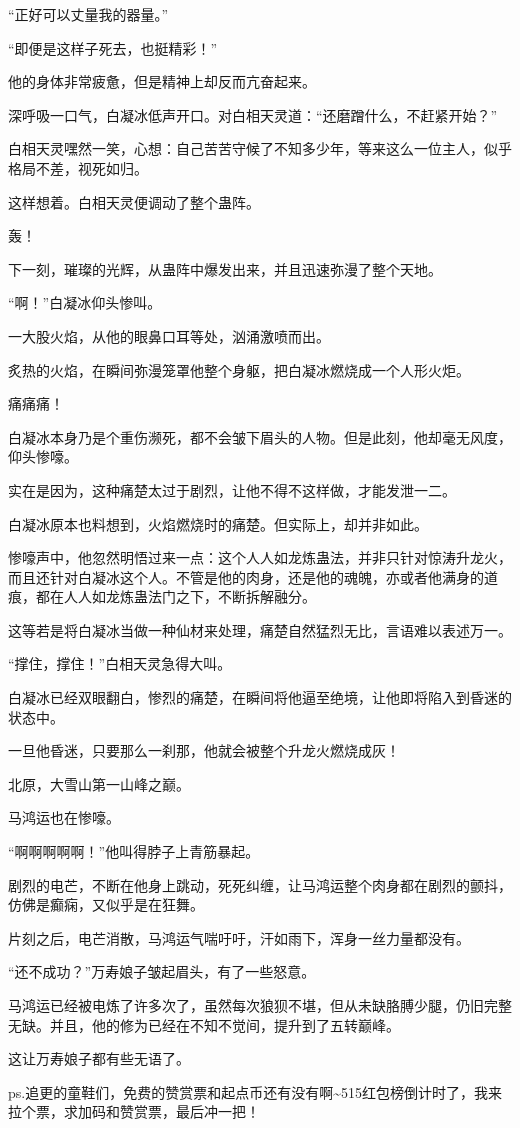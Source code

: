 \begin{this_body}
“正好可以丈量我的器量。”

“即便是这样子死去，也挺精彩！”

他的身体非常疲惫，但是精神上却反而亢奋起来。

深呼吸一口气，白凝冰低声开口。对白相天灵道：“还磨蹭什么，不赶紧开始？”

白相天灵嘿然一笑，心想：自己苦苦守候了不知多少年，等来这么一位主人，似乎格局不差，视死如归。

这样想着。白相天灵便调动了整个蛊阵。

轰！

下一刻，璀璨的光辉，从蛊阵中爆发出来，并且迅速弥漫了整个天地。

“啊！”白凝冰仰头惨叫。

一大股火焰，从他的眼鼻口耳等处，汹涌激喷而出。

炙热的火焰，在瞬间弥漫笼罩他整个身躯，把白凝冰燃烧成一个人形火炬。

痛痛痛！

白凝冰本身乃是个重伤濒死，都不会皱下眉头的人物。但是此刻，他却毫无风度，仰头惨嚎。

实在是因为，这种痛楚太过于剧烈，让他不得不这样做，才能发泄一二。

白凝冰原本也料想到，火焰燃烧时的痛楚。但实际上，却并非如此。

惨嚎声中，他忽然明悟过来一点：这个人人如龙炼蛊法，并非只针对惊涛升龙火，而且还针对白凝冰这个人。不管是他的肉身，还是他的魂魄，亦或者他满身的道痕，都在人人如龙炼蛊法门之下，不断拆解融分。

这等若是将白凝冰当做一种仙材来处理，痛楚自然猛烈无比，言语难以表述万一。

“撑住，撑住！”白相天灵急得大叫。

白凝冰已经双眼翻白，惨烈的痛楚，在瞬间将他逼至绝境，让他即将陷入到昏迷的状态中。

一旦他昏迷，只要那么一刹那，他就会被整个升龙火燃烧成灰！

北原，大雪山第一山峰之巅。

马鸿运也在惨嚎。

“啊啊啊啊啊！”他叫得脖子上青筋暴起。

剧烈的电芒，不断在他身上跳动，死死纠缠，让马鸿运整个肉身都在剧烈的颤抖，仿佛是癫痫，又似乎是在狂舞。

片刻之后，电芒消散，马鸿运气喘吁吁，汗如雨下，浑身一丝力量都没有。

“还不成功？”万寿娘子皱起眉头，有了一些怒意。

马鸿运已经被电炼了许多次了，虽然每次狼狈不堪，但从未缺胳膊少腿，仍旧完整无缺。并且，他的修为已经在不知不觉间，提升到了五转巅峰。

这让万寿娘子都有些无语了。

ps.追更的童鞋们，免费的赞赏票和起点币还有没有啊\~{}515红包榜倒计时了，我来拉个票，求加码和赞赏票，最后冲一把！

\end{this_body}

